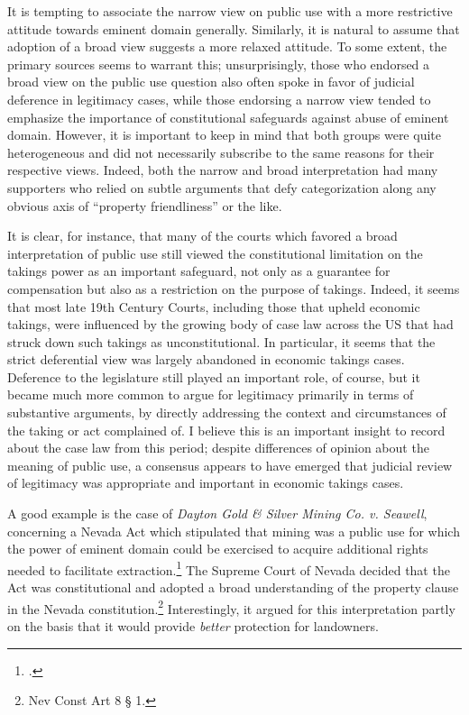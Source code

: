 It is tempting to associate the narrow view on public use with a more restrictive attitude towards eminent domain generally. Similarly, it is natural to assume that adoption of a broad view suggests a more relaxed attitude. To some extent, the primary sources seems to warrant this; unsurprisingly, those who endorsed a broad view on the public use question also often spoke in favor of judicial deference in legitimacy cases, while those endorsing a narrow view tended to emphasize the importance of constitutional safeguards against abuse of eminent domain. However, it is important to keep in mind that both groups were quite heterogeneous and did not necessarily subscribe to the same reasons for their respective views. Indeed, both the narrow and broad interpretation had many supporters who relied on subtle arguments that defy categorization along any obvious axis of ``property friendliness'' or the like.

It is clear, for instance, that many of the courts which favored a broad interpretation of public use still viewed the constitutional limitation on the takings power as an important safeguard, not only as a guarantee for compensation but also as a restriction on the purpose of takings. Indeed, it seems that most late 19th Century Courts, including those that upheld economic takings, were influenced by the growing body of case law across the US that had struck down such takings as unconstitutional. In particular, it seems that the strict deferential view was largely abandoned in economic takings cases. Deference to the legislature still played an important role, of course, but it became much more common to argue for legitimacy primarily in terms of substantive arguments, by directly addressing the context and circumstances of the taking or act complained of. I believe this is an important insight to record about the case law from this period; despite differences of opinion about the meaning of public use, a consensus appears to have emerged that judicial review of legitimacy was appropriate and important in economic takings cases.

A good example is the case of {\it Dayton Gold \& Silver Mining Co. v. Seawell}, concerning a Nevada Act which stipulated that mining was a public use for which the power of eminent domain could be exercised to acquire additional rights needed to facilitate extraction.\footcite{seawell76} The Supreme Court of Nevada decided that the Act was constitutional and adopted a broad understanding of the property clause in the Nevada constitution.\footnote{Nev Const Art 8 § 1.} Interestingly, it argued for this interpretation partly on the basis that it would provide {\it better} protection for landowners.

